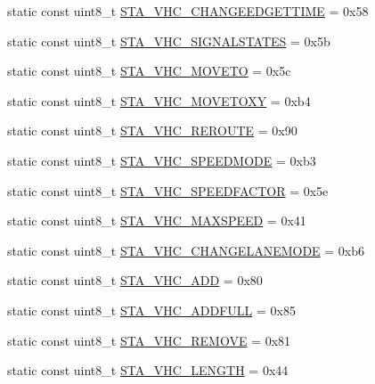 \begin{DoxyCompactItemize}
static const uint8\+\_\+t \hyperlink{classtraci__api_1_1_vehicle_manager_a90e63ce9894d2784451505ef43a02d7c}{S\+T\+A\+\_\+\+V\+H\+C\+\_\+\+C\+H\+A\+N\+G\+E\+E\+D\+G\+E\+T\+T\+I\+ME} = 0x58
\item 
static const uint8\+\_\+t \hyperlink{classtraci__api_1_1_vehicle_manager_a56909b0447f4c2edad044a4579334938}{S\+T\+A\+\_\+\+V\+H\+C\+\_\+\+S\+I\+G\+N\+A\+L\+S\+T\+A\+T\+ES} = 0x5b
\item 
static const uint8\+\_\+t \hyperlink{classtraci__api_1_1_vehicle_manager_a1bd791cd7190fa808b2b45dc2eaa8929}{S\+T\+A\+\_\+\+V\+H\+C\+\_\+\+M\+O\+V\+E\+TO} = 0x5c
\item 
static const uint8\+\_\+t \hyperlink{classtraci__api_1_1_vehicle_manager_afcb459d52da83576184bd006880ca157}{S\+T\+A\+\_\+\+V\+H\+C\+\_\+\+M\+O\+V\+E\+T\+O\+XY} = 0xb4
\item 
static const uint8\+\_\+t \hyperlink{classtraci__api_1_1_vehicle_manager_a066983f2b530670d111eb84e69beacd1}{S\+T\+A\+\_\+\+V\+H\+C\+\_\+\+R\+E\+R\+O\+U\+TE} = 0x90
\item 
static const uint8\+\_\+t \hyperlink{classtraci__api_1_1_vehicle_manager_a342b4b6d80950b22f1b74fd8e020395d}{S\+T\+A\+\_\+\+V\+H\+C\+\_\+\+S\+P\+E\+E\+D\+M\+O\+DE} = 0xb3
\item 
static const uint8\+\_\+t \hyperlink{classtraci__api_1_1_vehicle_manager_ab75abfc45f99aa7a031d5f4c8701c76c}{S\+T\+A\+\_\+\+V\+H\+C\+\_\+\+S\+P\+E\+E\+D\+F\+A\+C\+T\+OR} = 0x5e
\item 
static const uint8\+\_\+t \hyperlink{classtraci__api_1_1_vehicle_manager_a60e5548ae4ee814e33d6e7ec9581b6e3}{S\+T\+A\+\_\+\+V\+H\+C\+\_\+\+M\+A\+X\+S\+P\+E\+ED} = 0x41
\item 
static const uint8\+\_\+t \hyperlink{classtraci__api_1_1_vehicle_manager_a3c4d5d091512c5689442bed9dab017b0}{S\+T\+A\+\_\+\+V\+H\+C\+\_\+\+C\+H\+A\+N\+G\+E\+L\+A\+N\+E\+M\+O\+DE} = 0xb6
\item 
static const uint8\+\_\+t \hyperlink{classtraci__api_1_1_vehicle_manager_ae8241e67583df78a7937b1741a6533d1}{S\+T\+A\+\_\+\+V\+H\+C\+\_\+\+A\+DD} = 0x80
\item 
static const uint8\+\_\+t \hyperlink{classtraci__api_1_1_vehicle_manager_a650514c7298bd7ceb011aba2cd3318c8}{S\+T\+A\+\_\+\+V\+H\+C\+\_\+\+A\+D\+D\+F\+U\+LL} = 0x85
\item 
static const uint8\+\_\+t \hyperlink{classtraci__api_1_1_vehicle_manager_a8a3a1bbcd9217c289bb9e47a2aee838c}{S\+T\+A\+\_\+\+V\+H\+C\+\_\+\+R\+E\+M\+O\+VE} = 0x81
\item 
static const uint8\+\_\+t \hyperlink{classtraci__api_1_1_vehicle_manager_a9c1ca67d52057f033c38014b8e5adc8e}{S\+T\+A\+\_\+\+V\+H\+C\+\_\+\+L\+E\+N\+G\+TH} = 0x44

\end{DoxyCompactItemize}
